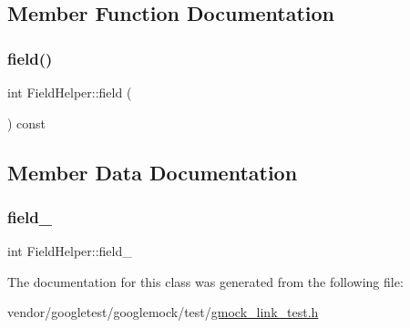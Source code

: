 \subsection{Member Function Documentation}
\mbox{\label{class_field_helper_af2959e142813205aeeb4d2ad27430ad3}} 
\subsubsection{\texorpdfstring{field()}{field()}}
{\footnotesize\ttfamily int Field\+Helper\+::field (\begin{DoxyParamCaption}{ }\end{DoxyParamCaption}) const\hspace{0.3cm}{\ttfamily [inline]}}



\subsection{Member Data Documentation}
\mbox{\label{class_field_helper_a50a7ec9efc60377363d5ce8bea1708ac}} 
\subsubsection{\texorpdfstring{field\+\_\+}{field\_}}
{\footnotesize\ttfamily int Field\+Helper\+::field\+\_\+}



The documentation for this class was generated from the following file\+:\begin{DoxyCompactItemize}
\item 
vendor/googletest/googlemock/test/\hyperlink{gmock__link__test_8h}{gmock\+\_\+link\+\_\+test.\+h}\end{DoxyCompactItemize}
